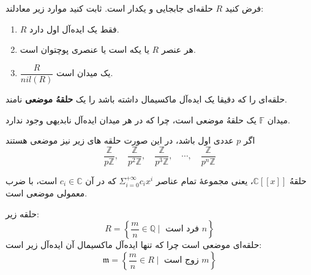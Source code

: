 \section{}

\begin{frame}
    \begin{exercise}
        فرض کنید \( R \) حلقه‌ای جابجایی و یکدار است. ثابت کنید موارد زیر معادلند:
        \begin{enumerate}
            \item \( R \) فقط یک ایده‌آل اول دارد.
            \item هر عنصر  \( R \) یا یکه است یا عنصری پوچتوان است.
            \item \( \dfrac{R}{nil(R)} \) یک میدان است.
        \end{enumerate}
    \end{exercise}

    \begin{definition}
        حلقه‌ای را که دقیقا یک ایده‌آل ماکسیمال داشته باشد را یک
        \textbf{حلقهُ موضعی}
        نامند.
    \end{definition}


\end{frame}

\begin{frame}
    \begin{example}
        میدان
        \(\mathbb{F} \)
        یک حلقهُ موضعی است،
        چرا که در هر میدان ایده‌آل نابدیهی وجود ندارد.
    \end{example}

    \begin{example}
        اگر
        \(p\)
        عددی اول باشد،‌ در این صورت حلقه های زیر نیز موضعی هستند
        \[\frac{\mathbb{Z}}{p\mathbb{Z}}, \quad\frac{\mathbb{Z}}{p^2\mathbb{Z}}, \quad\frac{\mathbb{Z}}{p^3\mathbb{Z}}, \quad\cdots,\quad \frac{\mathbb{Z}}{p^n\mathbb{Z}}\]
    \end{example}


    \begin{example}
        حلقهُ
        \(\mathbb{C}[[x]]\)،
        یعنی مجموعهٔ تمام عناصر
        \(\Sigma_{i=0}^{+\infty} c_ix^i\)
        که در آن
        \(c_i \in \mathbb{C}\)
        است، با ضرب معمولی موضعی است.
    \end{example}

\end{frame}

\begin{frame}
    \begin{example}
        حلقه زیر:
        \[
            R = \left\{ \frac{m}{n} \in \mathbb{Q} \mid \text{ فرد است } n \right\}
        \]
        حلقه‌ای موضعی است چرا که تنها ایده‌آل ماکسیمال آن ایده‌آل زیر است:
        \[
            \mathfrak{m} = \left\{ \frac{m}{n} \in R \mid \text{ زوج است } m \right\}
        \]
    \end{example}


\end{frame}

